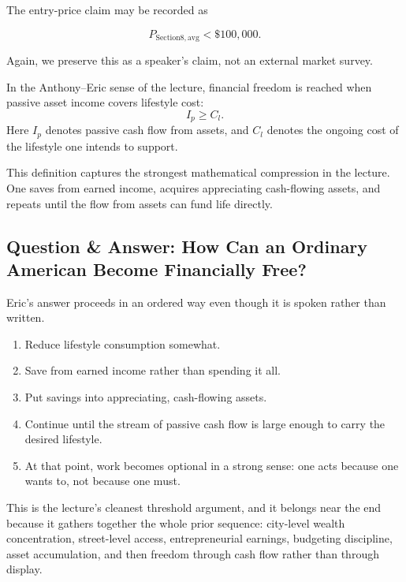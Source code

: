 The entry-price claim may be recorded as

\begin{equation}
P_{\mathrm{Section8,avg}} < \$100{,}000.
\end{equation}

Again, we preserve this as a speaker's claim, not an external market survey.

\begin{definition}
In the Anthony--Eric sense of the lecture, financial freedom is reached when passive asset income covers lifestyle cost:
\begin{equation}
I_p \ge C_l.
\end{equation}
Here \(I_p\) denotes passive cash flow from assets, and \(C_l\) denotes the ongoing cost of the lifestyle one intends to support.
\end{definition}

This definition captures the strongest mathematical compression in the lecture. One saves from earned income, acquires appreciating cash-flowing assets, and repeats until the flow from assets can fund life directly.

\subsection{Question \& Answer: How Can an Ordinary American Become Financially Free?}

Eric's answer proceeds in an ordered way even though it is spoken rather than written.

\begin{enumerate}
\item Reduce lifestyle consumption somewhat.
\item Save from earned income rather than spending it all.
\item Put savings into appreciating, cash-flowing assets.
\item Continue until the stream of passive cash flow is large enough to carry the desired lifestyle.
\item At that point, work becomes optional in a strong sense: one acts because one wants to, not because one must.
\end{enumerate}

This is the lecture's cleanest threshold argument, and it belongs near the end because it gathers together the whole prior sequence: city-level wealth concentration, street-level access, entrepreneurial earnings, budgeting discipline, asset accumulation, and then freedom through cash flow rather than through display.

